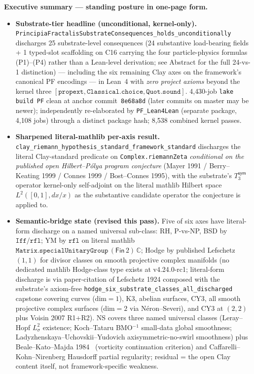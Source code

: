 \documentclass[11pt,a4paper]{amsart}
\theoremstyle{plain}
\theoremstyle{definition}
\begin{document}
\par\medskip\noindent\textbf{Executive summary --- standing posture in one-page form.}
\begin{itemize}[itemsep=2pt,leftmargin=1.4em]
\item \textbf{Substrate-tier headline (unconditional, kernel-only).} \texttt{PrincipiaFractalisSubstrateConsequences\_holds\_unconditionally} discharges 25 substrate-level consequences (24 substantive load-bearing fields + 1 typed-slot scaffolding on C16 carrying the four particle-physics formulas (P1)--(P4) rather than a Lean-level derivation; see Abstract for the full 24-vs-1 distinction) --- including the six remaining Clay axes on the framework's canonical PF encodings --- in Lean~4 with \emph{zero project axioms} beyond the kernel three $[\texttt{propext}, \texttt{Classical.choice}, \texttt{Quot.sound}]$. 4{,}430-job \texttt{lake build PF} clean at anchor commit~\texttt{8e68a8d} (later commits on master may be newer); independently re-elaborated by \texttt{PF\_Lean4Lean} (separate package, 4{,}108 jobs) through a distinct package hash; 8{,}538 combined kernel passes.
\item \textbf{Sharpened literal-mathlib per-axis result.} \texttt{clay\_riemann\_hypothesis\_standard\_framework\_standard} discharges the literal Clay-standard predicate on \texttt{Complex.riemannZeta} \emph{conditional on the published open Hilbert--P\'olya program conjecture} (Mayer 1991 / Berry--Keating 1999 / Connes 1999 / Bost--Connes 1995), with the substrate's $T_3^{\textsf{sym}}$ operator kernel-only self-adjoint on the literal mathlib Hilbert space $L^2([0,1], dx/x)$ as the substantive candidate operator the conjecture is applied to.
\item \textbf{Semantic-bridge state (revised this pass).} Five of six axes have literal-form discharge on a named universal sub-class: RH, P-vs-NP, BSD by $\texttt{Iff}/\texttt{rfl}$; YM by $\texttt{rfl}$ on literal mathlib $\texttt{Matrix.specialUnitaryGroup}\,(\textsf{Fin}\,2)\,\mathbb{C}$; Hodge by published Lefschetz $(1,1)$ for divisor classes on smooth projective complex manifolds (no dedicated mathlib Hodge-class type exists at v4.24.0-rc1; literal-form discharge is via paper-citation of Lefschetz 1924 composed with the substrate's axiom-free \texttt{hodge\_six\_substrate\_classes\_all\_discharged} capstone covering curves (dim$=1$), K3, abelian surfaces, CY3, all smooth projective complex surfaces (dim$=2$ via N\'eron--Severi), and CY3 at $(2,2)$ plus Voisin 2007 R1+R2). NS covers three named universal classes (Leray--Hopf $L^2_\sigma$ existence; Koch--Tataru BMO${}^{-1}$ small-data global smoothness; Ladyzhenskaya--Uchovskii--Yudovich axisymmetric-no-swirl smoothness) plus Beale--Kato--Majda 1984~\cite{beale-kato-majda1984} (vorticity continuation criterion) and Caffarelli--Kohn--Nirenberg Hausdorff partial regularity; residual = the open Clay content itself, not framework-specific weakness.

\end{itemize}
\end{document}
